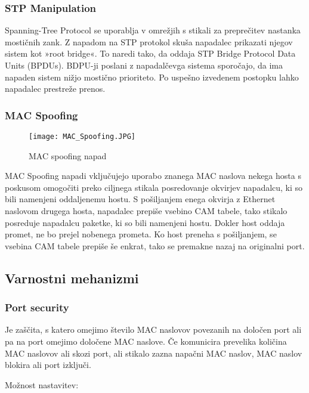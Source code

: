 \documentclass[12pt]{article}
\begin{document}
\subsubsection{STP Manipulation}
Spanning-Tree Protocol se uporablja v omrežjih s stikali za preprečitev nastanka mostičnih zank. Z napadom na STP protokol skuša napadalec prikazati njegov sistem kot »root bridge«. To naredi tako, da oddaja STP Bridge Protocol Data Units (BPDUs). BDPU-ji poslani z napadalčevga sistema sporočajo, da ima napaden sistem nižjo mostično prioriteto. Po uspešno izvedenem postopku lahko napadalec prestreže prenos.


\subsubsection{MAC Spoofing}

\begin{figure}[htb]
\begin{center}
\texttt{[image: MAC\_Spoofing.JPG]}
\end{center}
\caption{MAC spoofing napad}
\label{mac_spoofing}
\end{figure}

MAC Spoofing napadi vključujejo uporabo znanega MAC naslova nekega hosta s poskusom omogočiti preko ciljnega stikala posredovanje okvirjev napadalcu, ki so bili namenjeni oddaljenemu hostu. S pošiljanjem enega okvirja z Ethernet naslovom drugega hosta, napadalec prepiše vsebino CAM tabele, tako stikalo posreduje napadalcu paketke, ki so bili namenjeni hostu. Dokler host oddaja promet, ne bo prejel nobenega prometa. Ko host preneha s pošiljanjem, se vsebina CAM tabele prepiše še enkrat, tako se premakne nazaj na originalni port.


\subsection{Varnostni mehanizmi}

\subsubsection{Port security}

Je zaščita, s katero omejimo število MAC naslovov povezanih na določen port ali pa na port omejimo določene MAC naslove. Če komunicira prevelika količina MAC naslovov ali skozi port, ali stikalo zazna napačni MAC naslov, MAC naslov blokira ali port izključi.

Možnost nastavitev:
\end{document}
